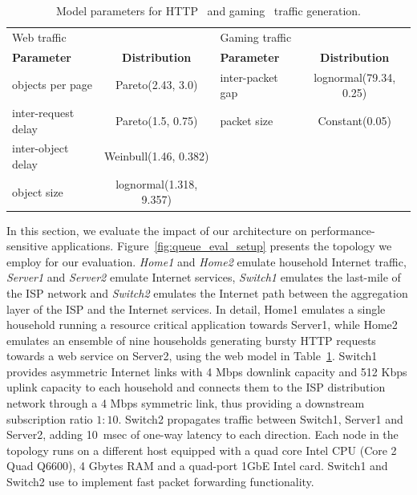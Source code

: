 \begin{table}
  \begin{tabular} {|l|c|l|c|}
    \hline
    Web traffic & & Gaming traffic & \\
    \textbf{Parameter} & \textbf{Distribution} & \textbf{Parameter} & \textbf{Distribution} \\
    \hline
    objects per page    & Pareto(2.43, 3.0)       & inter-packet gap & lognormal(79.34, 0.25)\\
    inter-request delay & Pareto(1.5, 0.75)       & packet size      & Constant(0.05) \\
    inter-object delay  & Weinbull(1.46, 0.382)   & &                 \\
    object size         & lognormal(1.318, 9.357) & &   \\
    \hline
  \end{tabular} 
  \caption{\label{t:homework:performance-web-model}Model parameters for HTTP~ and
    gaming~ traffic generation.}
\end{table}


In this section, we evaluate the impact of our architecture on
performance-sensitive applications.  Figure~\ref{fig:queue_eval_setup} presents
the topology we employ for our evaluation.  \textit{Home1} and \textit{Home2}
emulate household Internet traffic,  \textit{Server1} and \textit{Server2}
emulate Internet services,  \textit{Switch1} emulates the last-mile of the ISP
network and \textit{Switch2} emulates the Internet path between the aggregation
layer of the ISP and the Internet services. In detail, Home1 emulates a single
household running a resource critical application towards Server1, while Home2
emulates an ensemble of nine households generating bursty HTTP requests towards a
web service on Server2, using the web model in
Table~\ref{t:homework:performance-web-model}.  Switch1 provides asymmetric
Internet links with 4 Mbps downlink capacity and  512 Kbps uplink capacity to
each household and  connects them to the ISP distribution network through a 4
Mbps symmetric link, thus providing a downstream subscription ratio $1:10$.
Switch2 propagates traffic between Switch1, Server1 and Server2, adding 10~msec
of one-way latency to each direction. Each node in the  topology runs on a
different host equipped with a quad core Intel CPU (Core 2 Quad Q6600), 4 Gbytes
RAM and a quad-port 1GbE Intel card. Switch1 and Switch2 use \ovs to implement
fast packet forwarding functionality.


